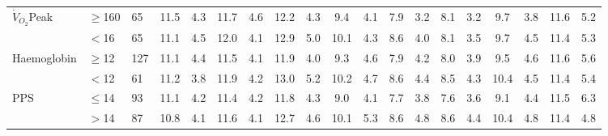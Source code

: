 \begin{sidewaystable}[p]
\begin{tabular}{|l ll | cc cc cc cc cc cc cc cc|}
		$\dot{V}_{O_2}$Peak & $\geq$160 & 65    & 11.5  & 4.3 & 11.7  & 4.6 & 12.2  & 4.3 & 9.4   & 4.1 & 7.9   & 3.2 & 8.1   & 3.2 & 9.7   & 3.8 & 11.6  & 5.2 \\
		                    & $<$16     & 65    & 11.1  & 4.5 & 12.0  & 4.1 & 12.9  & 5.0 & 10.1  & 4.3 & 8.6   & 4.0 & 8.1   & 3.5 & 9.7   & 4.5 & 11.4  & 5.3 \\
		Haemoglobin         & $\geq$12  & 127   & 11.1  & 4.4 & 11.5  & 4.1 & 11.9  & 4.0 & 9.3   & 4.6 & 7.9   & 4.2 & 8.0   & 3.9 & 9.5   & 4.6 & 11.6  & 5.6 \\
		                    & $<$12     & 61    & 11.2  & 3.8 & 11.9  & 4.2 & 13.0  & 5.2 & 10.2  & 4.7 & 8.6   & 4.4 & 8.5   & 4.3 & 10.4  & 4.5 & 11.4  & 5.4 \\
		PPS                 & $\leq$14  & 93    & 11.1  & 4.2 & 11.4  & 4.2 & 11.8  & 4.3 & 9.0   & 4.1 & 7.7   & 3.8 & 7.6   & 3.6 & 9.1   & 4.4 & 11.5  & 6.3 \\
		                    & $>$14     & 87    & 10.8  & 4.1 & 11.6  & 4.1 & 12.7  & 4.6 & 10.1  & 5.3 & 8.6   & 4.8 & 8.6   & 4.4 & 10.4  & 4.8 & 11.4  & 4.8 \\ \hline
	\end{tabular}	
\end{sidewaystable}






















